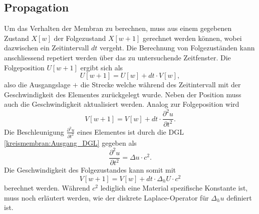 \subsection{Propagation}
Um das Verhalten der Membran zu berechnen, muss aus einem gegebenen Zustand $ X[w] $ der Folgezustand $ X[w+1] $ gerechnet werden können, wobei dazwischen ein Zeitintervall $ dt $ vergeht. 
Die Berechnung von Folgezuständen kann anschliessend repetiert werden über das zu untersuchende Zeitfenster.
Die Folgeposition $ U[w+1] $ ergibt sich als 
\begin{equation}
	U[w+1] =  U[w] + dt \cdot V[w],
\end{equation} 
also die Ausgangslage $ + $ die Strecke welche während des Zeitintervall mit der Geschwindigkeit des Elementes zurückgelegt wurde. 
Neben der Position muss auch die Geschwindigkeit aktualisiert werden.
Analog zur Folgeposition wird
\begin{equation*}
	V[w+1] = V[w] + dt \cdot \frac{\partial^2u}{\partial t^2}.
\end{equation*}    
Die Beschleunigung $ \frac{\partial^2u}{\partial t^2} $  eines Elementes ist durch die DGL \ref{kreismembran:Ausgang_DGL} gegeben als
\begin{equation*}
	\frac{\partial^2u}{\partial t^2} = \Delta u \cdot c^2.
\end{equation*}
Die Geschwindigkeit des Folgezustandes kann somit mit
\begin{equation}
	V[w+1] = V[w] + dt \cdot \Delta_h U \cdot c^2
\end{equation}
berechnet werden.
Während $ c^2 $ lediglich eine Material spezifische Konstante ist, muss noch erläutert werden, wie der diskrete Laplace-Operator für $ \Delta_h u $ definiert ist.

